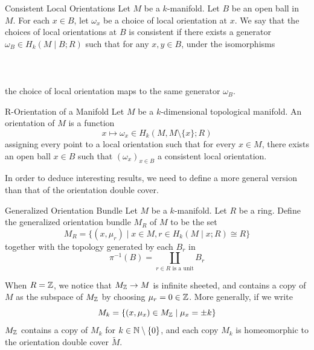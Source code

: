 \documentclass[a4paper]{article}
\begin{document}
\begin{defn}{Consistent Local Orientations}{} Let $M$ be a $k$-manifold. Let $B$ be an open ball in $M$. For each $x\in B$, let $\omega_x$ be a choice of local orientation at $x$. We say that the choices of local orientations at $B$ is consistent if there exists a generator $\omega_B\in H_k(M\;|\; B;R)$ such that for any $x,y\in B$, under the isomorphisms \\~\\
\\~\\
the choice of local orientation maps to the same generator $\omega_B$. 
\end{defn}

\begin{defn}{R-Orientation of a Manifold}{} Let $M$ be a $k$-dimensional topological manifold. An orientation of $M$ is a function $$x\mapsto\omega_x\in H_k(M,M\setminus\{x\};R)$$ assigning every point to a local orientation such that for every $x\in M$, there exists an open ball $x\in B$ such that $(\omega_x)_{x\in B}$ a consistent local orientation. 
\end{defn}

In order to deduce interesting results, we need to define a more general version than that of the orientation double cover. 

\begin{defn}{Generalized Orientation Bundle}{} Let $M$ be a $k$-manifold. Let $R$ be a ring. Define the generalized orientation bundle $M_R$ of $M$ to be the set $$M_R=\{(x,\mu_r)\;|\;x\in M, r\in H_k(M\;|\; x;R)\cong R\}$$ together with the topology generated by each $B_r$ in $$\pi^{-1}(B)=\coprod_{r\in R\text{ is a unit}}B_r$$
\end{defn}

When $R=\mathbb{Z}$, we notice that $M_{\mathbb{Z}}\to M$ is infinite sheeted, and contains a copy of $M$ as the subspace of $M_{\mathbb{Z}}$ by choosing $\mu_r=0\in\mathbb{Z}$. More generally, if we write $$M_k=\{(x,\mu_x)\in M_{\mathbb{Z}}\;|\;\mu_x=\pm k\}$$ $M_{\mathbb{Z}}$ contains a copy of $M_k$ for $k\in\mathbb{N}\setminus\{0\}$, and each copy $M_k$ is homeomorphic to the orientation double cover $\widetilde{M}$. \\
\end{document}
